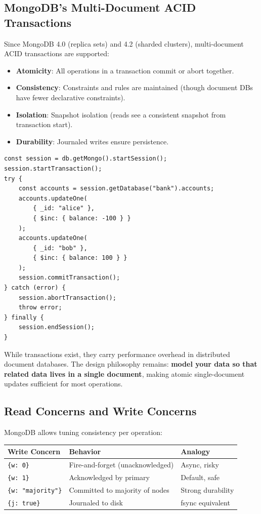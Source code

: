 \documentclass[12pt,a4paper]{article}
\begin{document}
\subsection{MongoDB's Multi-Document ACID Transactions}

Since MongoDB 4.0 (replica sets) and 4.2 (sharded clusters), multi-document ACID transactions are supported:

\begin{itemize}[noitemsep]
    \item \textbf{Atomicity}: All operations in a transaction commit or abort together.
    \item \textbf{Consistency}: Constraints and rules are maintained (though document DBs have fewer declarative constraints).
    \item \textbf{Isolation}: Snapshot isolation (reads see a consistent snapshot from transaction start).
    \item \textbf{Durability}: Journaled writes ensure persistence.
\end{itemize}

\begin{lstlisting}[language=MongoDB, caption={Multi-Document Transaction}]
const session = db.getMongo().startSession();
session.startTransaction();
try {
    const accounts = session.getDatabase("bank").accounts;
    accounts.updateOne(
        { _id: "alice" },
        { $inc: { balance: -100 } }
    );
    accounts.updateOne(
        { _id: "bob" },
        { $inc: { balance: 100 } }
    );
    session.commitTransaction();
} catch (error) {
    session.abortTransaction();
    throw error;
} finally {
    session.endSession();
}
\end{lstlisting}

\begin{rdbmsnote}
While transactions exist, they carry performance overhead in distributed document databases. The design philosophy remains: \textbf{model your data so that related data lives in a single document}, making atomic single-document updates sufficient for most operations.
\end{rdbmsnote}

\subsection{Read Concerns and Write Concerns}

MongoDB allows tuning consistency per operation:

\begin{center}
\begin{tabular}{@{}lll@{}}
\toprule
\textbf{Write Concern} & \textbf{Behavior} & \textbf{Analogy} \\
\midrule
\texttt{\{w: 0\}} & Fire-and-forget (unacknowledged) & Async, risky \\
\texttt{\{w: 1\}} & Acknowledged by primary & Default, safe \\
\texttt{\{w: "majority"\}} & Committed to majority of nodes & Strong durability \\
\texttt{\{j: true\}} & Journaled to disk & fsync equivalent \\
\bottomrule
\end{tabular}
\end{center}
\end{document}
